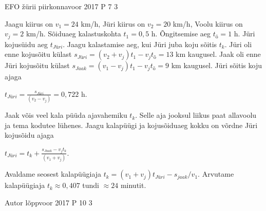 \documentclass[11pt]{article}
\begin{document}
{%
{EFO žürii} %
{piirkonnavoor} %
{2017} %
{P 7} %
{3} %
{

\ifSolution
Jaagu kiirus on $v_1 = 24$ km/h,
\newline
Jüri kiirus on $v_2 = 20$ km/h,
\newline
Voolu kiirus on $v_j = 2$ km/h.
\newline
Sõiduaeg kalastuskohta $t_1 = 0,5$ h.
\newline
Õngitsemise aeg $t_{õ} = 1$ h.
\newline
Jüri kojusüidu aeg $t_{Jüri}$.
\newline
Jaagu kalastamise aeg, kui Jüri juba koju sõitis $t_k$.
\newline
Jüri oli enne kojusõitu külast $s_{Jüri} = (v_2 + v_j)t_1 - v_j t_{õ} = 13$ km kaugusel. 
\newline
Jaak oli enne Jüri kojusõitu külast $s_{Jaak} = (v_1 - v_j )t_1 - v_j t_{õ} = 9$ km kaugusel.
\newline
Jüri sõitis koju ajaga
\begin{center}
$t_{Jüri} = \frac{s_{Jüri}}{(v_2 - v_j)} = 0,722$ h. 
\end{center}
Jaak võis veel kala püüda ajavahemiku $t_k$. Selle aja jooksul liikus paat allavoolu ja tema kodutee lühenes. Jaagu kalapüügi ja kojusõiduaeg kokku on võrdne Jüri kojusõidu ajaga 
\begin{center}
$t_{Jüri} = t_k + \frac{s_{Jaak} - v_j t_k}{(v_1 + v_j)}$.
\end{center}
Avaldame seosest kalapüügiaja $t_k = (v_1 + v_j)t_{Jüri} - s_{jaak}/v_1$.
\newline
Arvutame kalapüügiaja $t_k \approx 0,407$ tundi $\approx 24$ minutit.
\fi
}

{Autor} %
{lõppvoor} %
{2017} %
{P 10} %
{3} %
{

}}
\end{document}
